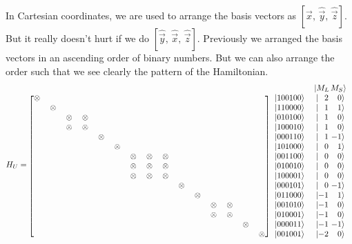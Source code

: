 In Cartesian coordinates, we are used to arrange the basis vectors as
$[\hat{\vec{x}},\,\hat{\vec{y}},\,\hat{\vec{z}}]$. But it really doesn't hurt if we
do $[\hat{\vec{y}},\,\hat{\vec{x}},\,\hat{\vec{z}}]$. Previously we arranged the basis
vectors in an ascending order of binary numbers. But we can also arrange
the order such that we see clearly the pattern of the Hamiltonian.
\begin{equation*}
H_U =
\begin{blockarray}{ccccccccccccccccc}
 &  &  &  &  &  &  &  &  &  &  &  &  &  &  &  & \Ket{M_{L}\,M_{S}} \\
\begin{block}{[ccccccccccccccc]cc}
\otimes &  &  &  &  &  &  &  &  &  &  &  &  &  &  & \Ket{100100} & \Ket{{\phantom{-}2}\ {\phantom{-}0}} \\
 & \otimes &  &  &  &  &  &  &  &  &  &  &  &  &  & \Ket{110000} & \Ket{{\phantom{-}1}\ {\phantom{-}1}} \\
 &  & \otimes & \otimes &  &  &  &  &  &  &  &  &  &  &  & \Ket{010100} & \Ket{{\phantom{-}1}\ {\phantom{-}0}} \\
 &  & \otimes & \otimes &  &  &  &  &  &  &  &  &  &  &  & \Ket{100010} & \Ket{{\phantom{-}1}\ {\phantom{-}0}} \\
 &  &  &  & \otimes &  &  &  &  &  &  &  &  &  &  & \Ket{000110} & \Ket{{\phantom{-}1}\ {-1}} \\
 &  &  &  &  & \otimes &  &  &  &  &  &  &  &  &  & \Ket{101000} & \Ket{{\phantom{-}0}\ {\phantom{-}1}} \\
 &  &  &  &  &  & \otimes & \otimes & \otimes &  &  &  &  &  &  & \Ket{001100} & \Ket{{\phantom{-}0}\ {\phantom{-}0}} \\
 &  &  &  &  &  & \otimes & \otimes & \otimes &  &  &  &  &  &  & \Ket{010010} & \Ket{{\phantom{-}0}\ {\phantom{-}0}} \\
 &  &  &  &  &  & \otimes & \otimes & \otimes &  &  &  &  &  &  & \Ket{100001} & \Ket{{\phantom{-}0}\ {\phantom{-}0}} \\
 &  &  &  &  &  &  &  &  & \otimes &  &  &  &  &  & \Ket{000101} & \Ket{{\phantom{-}0}\ {-1}} \\
 &  &  &  &  &  &  &  &  &  & \otimes &  &  &  &  & \Ket{011000} & \Ket{{-1}\ {\phantom{-}1}} \\
 &  &  &  &  &  &  &  &  &  &  & \otimes & \otimes &  &  & \Ket{001010} & \Ket{{-1}\ {\phantom{-}0}} \\
 &  &  &  &  &  &  &  &  &  &  & \otimes & \otimes &  &  & \Ket{010001} & \Ket{{-1}\ {\phantom{-}0}} \\
 &  &  &  &  &  &  &  &  &  &  &  &  & \otimes &  & \Ket{000011} & \Ket{{-1}\ {-1}} \\
  &  &  &  &  &  &  &  &  &  &  &  &  &  & \otimes & \Ket{001001} & \Ket{{-2}\ {\phantom{-}0}} \\
\end{block}
\end{blockarray}
\end{equation*}
